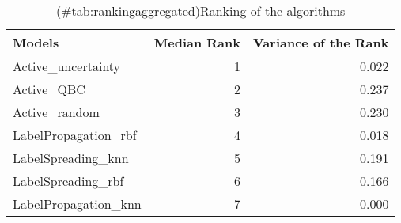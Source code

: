 \begin{table}[!h]

\caption{(\#tab:rankingaggregated)Ranking of the algorithms}
\centering
\begin{tabular}[t]{lrr}
\toprule
Models & Median Rank & Variance of the Rank\\
\midrule
Active\_uncertainty & 1 & 0.022\\
Active\_QBC & 2 & 0.237\\
Active\_random & 3 & 0.230\\
LabelPropagation\_rbf & 4 & 0.018\\
LabelSpreading\_knn & 5 & 0.191\\
LabelSpreading\_rbf & 6 & 0.166\\
LabelPropagation\_knn & 7 & 0.000\\
\bottomrule
\end{tabular}
\end{table}
